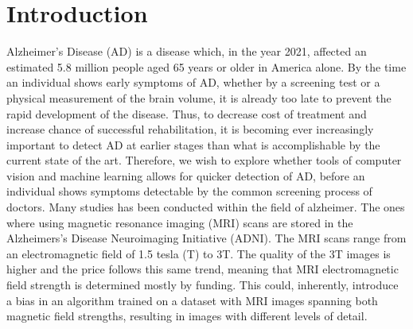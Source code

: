 \documentclass[12pt, fleqn, titlepage]{article}
\begin{document}
\begin{abstract}
	
\end{abstract}

{
\hypersetup{linkcolor=black}
\tableofcontents 
\newpage
}

\section{Introduction} \label{indledning}
Alzheimer’s Disease (AD) is a disease which, in the year 2021, affected an
estimated 5.8 million people aged 65 years or older in America alone. By the
time an individual shows early symptoms of AD, whether by a screening test
or a physical measurement of the brain volume, it is already too late to prevent the rapid development of the disease. Thus, to decrease cost of treatment
and increase chance of successful rehabilitation, it is becoming ever increasingly
important to detect AD at earlier stages than what is accomplishable by the
current state of the art. Therefore, we wish to explore whether tools of computer vision and machine learning allows for quicker detection of AD, before
an individual shows symptoms detectable by the common screening process of
doctors. Many studies has been conducted within the field of alzheimer. The ones where using magnetic resonance imaging (MRI) scans are stored
in the Alzheimers’s Disease Neuroimaging Initiative (ADNI). The MRI scans
range from an electromagnetic field of 1.5 tesla (T) to 3T. The quality of the 3T
images is higher and the price follows this same trend, meaning that MRI electromagnetic field strength is determined mostly by funding. This could, inherently, introduce a bias in an algorithm trained on a dataset with MRI images
spanning both magnetic field strengths, resulting in images with different levels
of detail.
\end{document}
